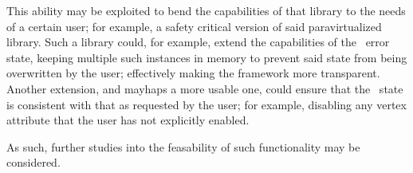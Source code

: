 This ability may be exploited to bend the capabilities of that library to the needs of a certain user; for example, a safety critical version of said paravirtualized library.
Such a library could, for example, extend the capabilities of the \dvttermopengl\ error state, keeping multiple such instances in memory to prevent said state from being overwritten by the user; effectively making the framework more transparent.
Another extension, and mayhaps a more usable one, could ensure that the \dvttermopengl\ state is consistent with that as requested by the user; for example, disabling any vertex attribute that the user has not explicitly enabled.

As such, further studies into the feasability of such functionality may be considered.
